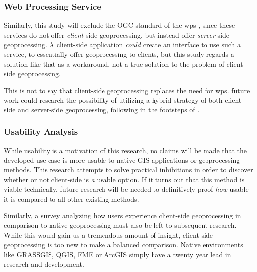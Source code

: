 \subsubsection*{ Web Processing Service } %

Similarly, this study will exclude the OGC standard of the \ac{wps} \cite{ogc_web_2015}, since these services do not offer \emph{client} side geoprocessing, but instead offer \emph{server} side geoprocessing. A client-side application \textit{could} create an interface to use such a service, to essentially offer geoprocessing to clients, but this study regards a solution like that as a workaround, not a true solution to the problem of client-side geoprocessing. 

This is not to say that client-side geoprocessing replaces the need for \ac{wps}. 
future work could research the possibility of utilizing a hybrid strategy of both client-side and server-side geoprocessing, following in the footsteps of \cite{panidi_hybrid_2015}. 



\subsubsection*{ Usability Analysis } %

While usability is a motivation of this research, no claims will be made that the developed use-case is more usable to native GIS applications or geoprocessing methods. This research attempts to solve practical inhibitions in order to discover whether or not client-side is \emph{a} usable option. If it turns out that this method is viable technically, future research will be needed to definitively proof \emph{how} usable it is compared to all other existing methods.  


Similarly, a survey analyzing how users experience client-side geoprocessing in comparison to native geoprocessing must also be left to subsequent research. While this would gain us a tremendous amount of insight, client-side geoprocessing is too new to make a balanced comparison. Native environments like GRASSGIS, QGIS, FME or ArcGIS simply have a twenty year lead in research and development. 









